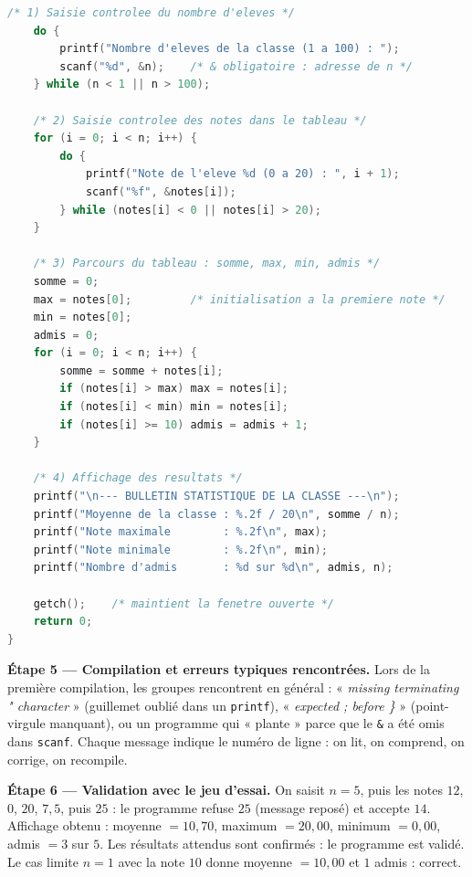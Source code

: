 \documentclass[11pt]{article}
\begin{document}
\begin{exoresolu}
\begin{lstlisting}[language=C]
    /* 1) Saisie controlee du nombre d'eleves */
    do {
        printf("Nombre d'eleves de la classe (1 a 100) : ");
        scanf("%d", &n);    /* & obligatoire : adresse de n */
    } while (n < 1 || n > 100);

    /* 2) Saisie controlee des notes dans le tableau */
    for (i = 0; i < n; i++) {
        do {
            printf("Note de l'eleve %d (0 a 20) : ", i + 1);
            scanf("%f", &notes[i]);
        } while (notes[i] < 0 || notes[i] > 20);
    }

    /* 3) Parcours du tableau : somme, max, min, admis */
    somme = 0;
    max = notes[0];         /* initialisation a la premiere note */
    min = notes[0];
    admis = 0;
    for (i = 0; i < n; i++) {
        somme = somme + notes[i];
        if (notes[i] > max) max = notes[i];
        if (notes[i] < min) min = notes[i];
        if (notes[i] >= 10) admis = admis + 1;
    }

    /* 4) Affichage des resultats */
    printf("\n--- BULLETIN STATISTIQUE DE LA CLASSE ---\n");
    printf("Moyenne de la classe : %.2f / 20\n", somme / n);
    printf("Note maximale        : %.2f\n", max);
    printf("Note minimale        : %.2f\n", min);
    printf("Nombre d'admis       : %d sur %d\n", admis, n);

    getch();    /* maintient la fenetre ouverte */
    return 0;
}
\end{lstlisting}

\textbf{Étape 5 — Compilation et erreurs typiques rencontrées.} Lors de la première compilation, les groupes rencontrent en général : « \emph{missing terminating " character} » (guillemet oublié dans un \texttt{printf}), « \emph{expected ; before \}} » (point-virgule manquant), ou un programme qui « plante » parce que le \texttt{\&} a été omis dans \texttt{scanf}. Chaque message indique le numéro de ligne : on lit, on comprend, on corrige, on recompile.

\textbf{Étape 6 — Validation avec le jeu d'essai.} On saisit $n = 5$, puis les notes $12$, $0$, $20$, $7{,}5$, puis $25$ : le programme refuse $25$ (message reposé) et accepte $14$. Affichage obtenu : moyenne $= 10{,}70$, maximum $= 20{,}00$, minimum $= 0{,}00$, admis $= 3$ sur $5$. Les résultats attendus sont confirmés : le programme est validé. Le cas limite $n = 1$ avec la note $10$ donne moyenne $= 10{,}00$ et $1$ admis : correct.
\end{exoresolu}
\end{document}
